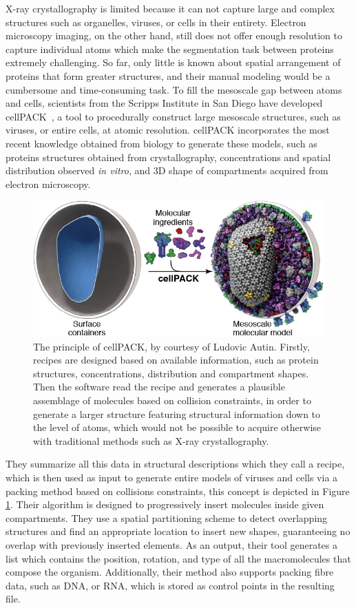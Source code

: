 X-ray crystallography is limited because it can not capture large and complex structures such as organelles, viruses, or cells in their entirety.
Electron microscopy imaging, on the other hand, still does not offer enough resolution to capture individual atoms which make the segmentation task between proteins extremely challenging.
So far, only little is known about spatial arrangement of proteins that form greater structures, and their manual modeling would be a cumbersome and time-consuming task.
To fill the mesoscale gap between atoms and cells, scientists from the Scripps Institute in San Diego have developed cellPACK~\cite{johnson2015cellpack}, a tool to procedurally construct large mesoscale structures, such as viruses, or entire cells, at atomic resolution.
cellPACK incorporates the most recent knowledge obtained from biology to generate these models, such as proteins structures obtained from crystallography, concentrations and spatial distribution observed \textit{in vitro}, and 3D shape of compartments acquired from electron microscopy.

\begin{figure}
\centering
\includegraphics[width=0.85\linewidth]{graphics/cellpack_1}
\caption{The principle of cellPACK, by courtesy of Ludovic Autin. Firstly, recipes are designed based on available information, such as protein structures, concentrations, distribution and compartment shapes. Then the software read the recipe and generates a plausible assemblage of molecules based on collision constraints, in order to generate a larger structure featuring structural information down to the level of atoms, which would not be possible to acquire otherwise with traditional methods such as X-ray crystallography.}
\label{fig:cellpack}
\end{figure}


They summarize all this data in structural descriptions which they call a recipe, which is then used as input to generate entire models of viruses and cells via a packing method based on collisions constraints, this concept is depicted in Figure \ref{fig:cellpack}.
Their algorithm is designed to progressively insert molecules inside given compartments.
They use a spatial partitioning scheme to detect overlapping structures and find an appropriate location to insert new shapes, guaranteeing no overlap with previously inserted elements.
As an output, their tool generates a list which contains the position, rotation, and type of all the macromolecules that compose the organism.
Additionally, their method also supports packing fibre data, such as DNA, or RNA, which is stored as control points in the resulting file.

